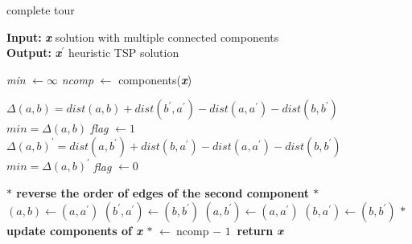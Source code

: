     \noindent
    
    \begin{algorithm}[H]
    \caption{complete tour}\label{complete tour}
    \hspace*{\algorithmicindent} \textbf{Input:} \textbf{\textit{x}} solution with multiple connected components \\ 
    \hspace*{\algorithmicindent} \textbf{Output:} \textbf{\textit{x}$^{\prime}$} heuristic TSP solution
    \begin{algorithmic}[1]
    \State \textit{min} $\gets \infty$
    \State \textit{ncomp} $\gets $ components(\textbf{\textit{x}})
    
	
	\State $\Delta(a,b) = dist(a, b) + dist(b^{\prime}, a^{\prime}) - dist(a, a^{\prime}) - dist(b, b^{\prime})$
	\State $ min = \Delta(a,b) $
	\State \textit{flag} $\gets 1$
	\EndIf 
	\State $\Delta(a,b)^{\prime} = dist(a, b^{\prime}) + dist(b, a^{\prime}) - dist(a, a^{\prime}) - dist(b, b^{\prime})$
	\State $ min = \Delta(a,b)^{\prime}  $
	\State \textit{flag} $\gets 0$
	\EndIf 
	\EndIf 
    \EndFor
    	\end{algorithmic}
	\label{alg:completetouralg}
   	\end{algorithm}
	\noindent
	\begin{algorithm}                   
   	 \begin{algorithmic} [1]              
    \State \textbf{$\ast$ reverse the order of edges of the second component $\ast$ }
    \State $ (a, b) \gets (a, a^{\prime})$
    \State $ (b^{\prime}, a^{\prime}) \gets (b, b^{\prime})$
    \EndIf 
    \State $ (a, b^{\prime}) \gets (a, a^{\prime})$
    \State $ (b, a^{\prime}) \gets (b, b^{\prime})$
    \EndIf 
    \State \textbf{$\ast$ update components of \textbf{\textit{x}} $\ast$ }
    \State {} $\gets \text{ncomp $-$ 1} $    
    \EndWhile
    \State \textbf{return} $ \textbf{\textit{x}} $
    \end{algorithmic}
    \end{algorithm}

